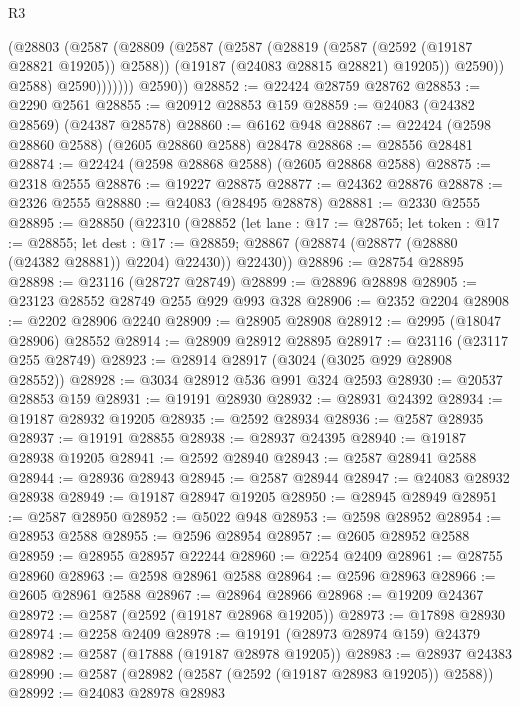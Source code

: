 \begin{lexlean}{R3}
\begin{coremodule}
                    (@28803
                      (@2587
                        (@28809
                          (@2587
                            (@2587
                              (@28819 (@2587 (@2592 (@19187 @28821 @19205)) @2588))
                              (@19187 (@24083 @28815 @28821) @19205))
                            @2590))
                        @2588)
                      @2590)))))))
        @2590))
@28852 := @22424 @28759 @28762
@28853 := @2290 @2561
@28855 := @20912 @28853 @159
@28859 := @24083 (@24382 @28569) (@24387 @28578)
@28860 := @6162 @948
@28867 := @22424 (@2598 @28860 @2588) (@2605 @28860 @2588) @28478
@28868 := @28556 @28481
@28874 := @22424 (@2598 @28868 @2588) (@2605 @28868 @2588)
@28875 := @2318 @2555
@28876 := @19227 @28875
@28877 := @24362 @28876
@28878 := @2326 @2555
@28880 := @24083 (@28495 @28878)
@28881 := @2330 @2555
@28895 := @28850
    (@22310
      (@28852
        (let lane : @17 := @28765;
        let token : @17 := @28855;
        let dest : @17 := @28859; @28867 (@28874 (@28877 (@28880 (@24382 @28881)) @2204) @22430))
        @22430))
@28896 := @28754 @28895
@28898 := @23116 (@28727 @28749)
@28899 := @28896 @28898
@28905 := @23123 @28552 @28749 @255 @929 @993 @328
@28906 := @2352 @2204
@28908 := @2202 @28906 @2240
@28909 := @28905 @28908
@28912 := @2995 (@18047 @28906) @28552
@28914 := @28909 @28912 @28895
@28917 := @23116 (@23117 @255 @28749)
@28923 := @28914 @28917 (@3024 (@3025 @929 @28908 @28552))
@28928 := @3034 @28912 @536 @991 @324 @2593
@28930 := @20537 @28853 @159
@28931 := @19191 @28930
@28932 := @28931 @24392
@28934 := @19187 @28932 @19205
@28935 := @2592 @28934
@28936 := @2587 @28935
@28937 := @19191 @28855
@28938 := @28937 @24395
@28940 := @19187 @28938 @19205
@28941 := @2592 @28940
@28943 := @2587 @28941 @2588
@28944 := @28936 @28943
@28945 := @2587 @28944
@28947 := @24083 @28932 @28938
@28949 := @19187 @28947 @19205
@28950 := @28945 @28949
@28951 := @2587 @28950
@28952 := @5022 @948
@28953 := @2598 @28952
@28954 := @28953 @2588
@28955 := @2596 @28954
@28957 := @2605 @28952 @2588
@28959 := @28955 @28957 @22244
@28960 := @2254 @2409
@28961 := @28755 @28960
@28963 := @2598 @28961 @2588
@28964 := @2596 @28963
@28966 := @2605 @28961 @2588
@28967 := @28964 @28966
@28968 := @19209 @24367
@28972 := @2587 (@2592 (@19187 @28968 @19205))
@28973 := @17898 @28930
@28974 := @2258 @2409
@28978 := @19191 (@28973 @28974 @159) @24379
@28982 := @2587 (@17888 (@19187 @28978 @19205))
@28983 := @28937 @24383
@28990 := @2587 (@28982 (@2587 (@2592 (@19187 @28983 @19205)) @2588))
@28992 := @24083 @28978 @28983

\end{coremodule}
\end{lexlean}
